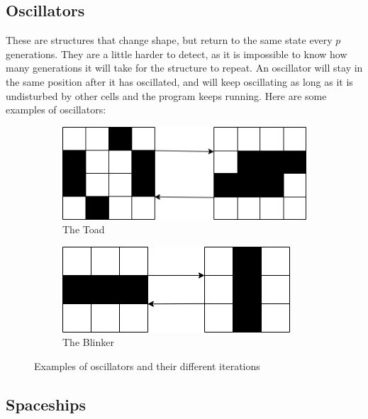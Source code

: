 \documentclass{l4proj}
\begin{document}
\subsection{Oscillators}

These are structures that change shape, but return to the same state every $p$ generations. They are a little harder to detect, as it is impossible to know how many generations it will take for the structure to repeat. An oscillator will stay in the same position after it has oscillated, and will keep oscillating as long as it is undisturbed by other cells and the program keeps running. Here are some examples of oscillators:

\begin{figure}[h]
\centering
\begin{subfigure}[b]{0.4\textwidth}
    \includegraphics[width=\textwidth]{dissertation/images/gol_structures/toad_transition.png} 
    \caption{The Toad}
    \label{fig:subim1}
\end{subfigure}
\hfill
\begin{subfigure}[b]{0.4\textwidth}
    \includegraphics[width=\textwidth]{dissertation/images/gol_structures/blinker_transition.png} 
    \caption{The Blinker}
    \label{fig:subim1}
\end{subfigure}

\caption{Examples of oscillators and their different iterations}
\end{figure}

\subsection{Spaceships}
\end{document}
